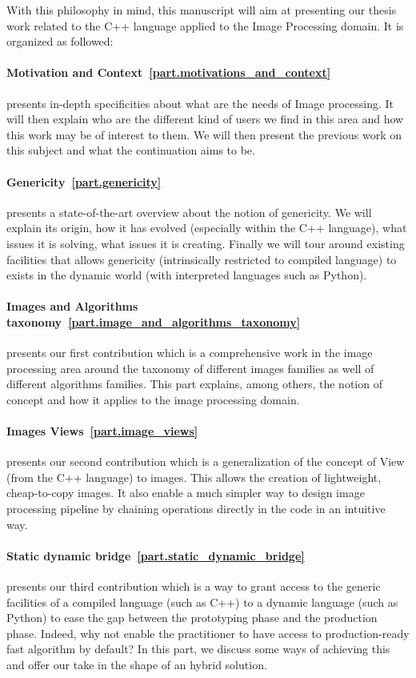 With this philosophy in mind, this manuscript will aim at presenting our thesis work related to the C++ language applied
to the Image Processing domain. It is organized as followed:

\paragraph{Motivation and Context~\ref{part.motivations_and_context}} presents in-depth specificities about what are the
needs of Image processing. It will then explain who are the different kind of users we find in this area and how this
work may be of interest to them. We will then present the previous work on this subject and what the continuation aims
to be.

\paragraph{Genericity~\ref{part.genericity}} presents a state-of-the-art overview about the notion of genericity. We
will explain its origin, how it has evolved (especially within the C++ language), what issues it is solving, what issues
it is creating. Finally we will tour around existing facilities that allows genericity (intrinsically restricted to
compiled language) to exists in the dynamic world (with interpreted languages such as Python).

\paragraph{Images and Algorithms taxonomy~\ref{part.image_and_algorithms_taxonomy}} presents our first contribution
which is a comprehensive work in the image processing area around the taxonomy of different images families as well of
different algorithms families. This part explains, among others, the notion of concept and how it applies to the
image processing domain.

\paragraph{Images Views~\ref{part.image_views}} presents our second contribution which is a generalization of the
concept of View (from the C++ language) to images. This allows the creation of lightweight, cheap-to-copy images. It
also enable a much simpler way to design image processing pipeline by chaining operations directly in the code in an
intuitive way.

\paragraph{Static dynamic bridge~\ref{part.static_dynamic_bridge}} presents our third contribution which is a way to
grant access to the generic facilities of a compiled language (such as C++) to a dynamic language (such as Python) to
ease the gap between the prototyping phase and the production phase. Indeed, why not enable the practitioner to have
access to production-ready fast algorithm by default? In this part, we discuss some ways of achieving this and offer our
take in the shape of an hybrid solution.




